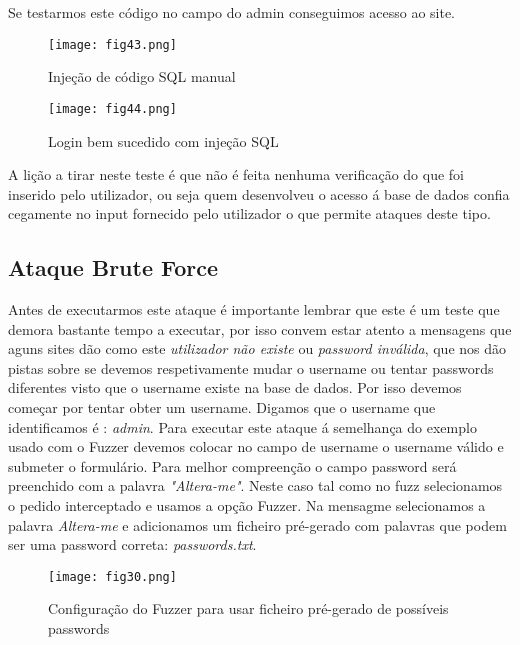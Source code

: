 Se testarmos este código no campo do admin conseguimos acesso ao site.

\begin{figure}[H]

  \centering

  \texttt{[image: fig43.png]}

  \caption{Injeção de código SQL manual}

\end{figure}
\begin{figure}[H]

  \centering

  \texttt{[image: fig44.png]}

  \caption{Login bem sucedido com injeção SQL}

\end{figure}

A lição a tirar neste teste é que não é feita nenhuma verificação do que foi inserido pelo utilizador, ou seja quem desenvolveu o acesso á base de dados confia cegamente no input fornecido pelo utilizador o que permite ataques deste tipo.





\subsection{Ataque Brute Force}

Antes de executarmos este ataque é importante lembrar que este é um teste que demora bastante tempo a executar, por isso convem estar atento a mensagens que aguns sites dão como este \textit{utilizador não existe} ou \textit{password inválida}, que nos dão pistas sobre se devemos respetivamente mudar o username ou tentar passwords diferentes visto que o username existe na base de dados. Por isso devemos começar por tentar obter um username. Digamos que o username que identificamos é : \textit{admin}.
Para executar este ataque á semelhança do exemplo usado com o Fuzzer devemos colocar  no campo de username o username válido e submeter o formulário. Para melhor compreenção o campo password será preenchido com a palavra \textit{"Altera-me"}.
Neste caso tal como no fuzz selecionamos o pedido interceptado e usamos a opção Fuzzer. Na mensagme selecionamos a palavra \textit{Altera-me} e adicionamos um ficheiro pré-gerado com palavras que podem ser uma password correta: \textit{passwords.txt}.


\begin{figure}[H]

  \centering

  \texttt{[image: fig30.png]}

  \caption{Configuração do Fuzzer para usar ficheiro pré-gerado de possíveis passwords}

\end{figure}

